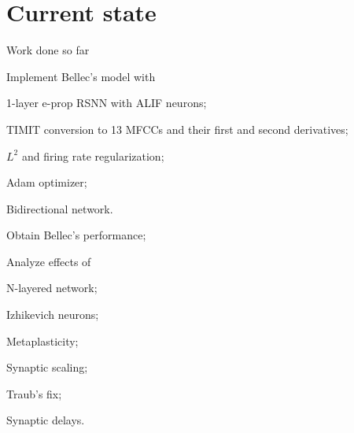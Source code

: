 \documentclass[t]{beamer}
\newcommand{\cmark}{\ding{51}}%
\newcommand{\done}{\rlap{$\square$}{\raisebox{2pt}{\large\hspace{1pt}\cmark}}%
\hspace{-2.5pt}}
\begin{document}
\section{Current state}
\begin{frame}{Work done so far}
	\begin{todolist}

    \item[\done] Implement Bellec's model with
    \begin{todolist}
    	\item[\done] 1-layer e-prop RSNN with ALIF neurons;
    	\item[\done] TIMIT conversion to 13 MFCCs and their first and second derivatives;
    	\item[\done] $L^2$ and firing rate regularization;
    	\item[\done] Adam optimizer;
    \item[\done] Bidirectional network.
    \end{todolist}
    \item Obtain Bellec's performance;
    \item Analyze effects of
    \begin{todolist}
    	\item[\done] N-layered network;
    \item Izhikevich neurons;
    	\item Metaplasticity;
    	\item[\done] Synaptic scaling;
    	\item[\done] Traub's fix;
    	\item Synaptic delays.
    \end{todolist}
  \end{todolist}
  

\end{frame}
\end{document}
